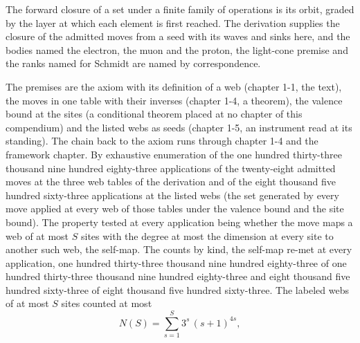 \begin{chbridge}
The forward closure of a set under a finite family of operations is its orbit, graded by the layer at which each element is first reached. The derivation supplies the closure of the admitted moves from a seed with its waves and sinks here, and the bodies named the electron, the muon and the proton, the light-cone premise and the ranks named for Schmidt are named by correspondence.
\end{chbridge}
\begin{chproof}[census]
The premises are the axiom with its definition of a web (chapter 1-1, the text), the moves in one table with their inverses (chapter 1-4, a theorem), the valence bound at the sites (a conditional theorem placed at no chapter of this compendium) and the listed webs as seeds (chapter 1-5, an instrument read at its standing). The chain back to the axiom runs through chapter 1-4 and the framework chapter. By exhaustive enumeration of the one hundred thirty-three thousand nine hundred eighty-three applications of the twenty-eight admitted moves at the three web tables of the derivation and of the eight thousand five hundred sixty-three applications at the listed webs (the set generated by every move applied at every web of those tables under the valence bound and the site bound). The property tested at every application being whether the move maps a web of at most $S$ sites with the degree at most the dimension at every site to another such web, the self-map. The counts by kind, the self-map re-met at every application, one hundred thirty-three thousand nine hundred eighty-three of one hundred thirty-three thousand nine hundred eighty-three and eight thousand five hundred sixty-three of eight thousand five hundred sixty-three. The labeled webs of at most $S$ sites counted at most
\begin{equation}
N(S) = \sum_{s=1}^{S} 3^{s}\,(s+1)^{4s} ,
\end{equation}

\end{chproof}
